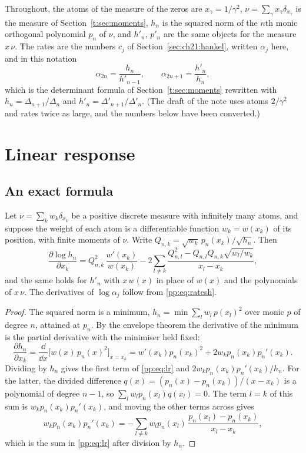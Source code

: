 Throughout, the atoms of the measure of the zeros are $x_\gamma=1/\gamma^2$, $\nu=\sum_\gamma x_\gamma\delta_{x_\gamma}$ is the measure of Section~\ref{t:sec:moments}, $h_n$ is the squared norm of the $n$th monic orthogonal polynomial $p_n$ of $\nu$, and $h'_n$, $p'_n$ are the same objects for the measure $x\,\nu$. The rates are the numbers $c_j$ of Section~\ref{sec:ch21:hankel}, written $\alpha_j$ here, and in this notation
\begin{equation}\label{pp:eq:ratesh}
\alpha_{2n}=\frac{h_n}{h'_{n-1}},\qquad \alpha_{2n+1}=\frac{h'_n}{h_n},
\end{equation}
which is the determinant formula of Section~\ref{t:sec:moments} rewritten with $h_n=\Delta_{n+1}/\Delta_n$ and $h'_n=\Delta'_{n+1}/\Delta'_n$. (The draft of the note uses atoms $2/\gamma^2$ and rates twice as large, and the numbers below have been converted.)

\section{Linear response}\label{pp:sec:lr}

\subsection{An exact formula}

\begin{theorem}\label{pp:thm:lr}
Let $\nu=\sum_kw_k\delta_{x_k}$ be a positive discrete measure with infinitely many atoms, and suppose the weight of each atom is a differentiable function $w_k=w(x_k)$ of its position, with finite moments of $\nu$. Write $Q_{n,k}=\sqrt{w_k}\,p_n(x_k)/\sqrt{h_n}$. Then
\begin{equation}\label{pp:eq:lr}
\frac{\partial\log h_n}{\partial x_k}=Q_{n,k}^2\,\frac{w'(x_k)}{w(x_k)}-2\sum_{l\ne k}\frac{Q_{n,l}^2-Q_{n,l}Q_{n,k}\sqrt{w_l/w_k}}{x_l-x_k},
\end{equation}
and the same holds for $h'_n$ with $x\,w(x)$ in place of $w(x)$ and the polynomials of $x\,\nu$. The derivatives of $\log\alpha_j$ follow from \eqref{pp:eq:ratesh}.
\end{theorem}

\begin{proof}
The squared norm is a minimum, $h_n=\min\sum_lw_l\,p(x_l)^2$ over monic $p$ of degree $n$, attained at $p_n$. By the envelope theorem the derivative of the minimum is the partial derivative with the minimiser held fixed:
\[
\frac{\partial h_n}{\partial x_k}=\frac{\dd}{\dd x}\Big[w(x)\,p_n(x)^2\Big]_{x=x_k}=w'(x_k)p_n(x_k)^2+2w_kp_n(x_k)p_n'(x_k).
\]
Dividing by $h_n$ gives the first term of \eqref{pp:eq:lr} and $2w_kp_n(x_k)p_n'(x_k)/h_n$. For the latter, the divided difference $q(x)=(p_n(x)-p_n(x_k))/(x-x_k)$ is a polynomial of degree $n-1$, so $\sum_lw_lp_n(x_l)q(x_l)=0$. The term $l=k$ of this sum is $w_kp_n(x_k)p_n'(x_k)$, and moving the other terms across gives
\[
w_kp_n(x_k)p_n'(x_k)=-\sum_{l\ne k}w_lp_n(x_l)\,\frac{p_n(x_l)-p_n(x_k)}{x_l-x_k},
\]
which is the sum in \eqref{pp:eq:lr} after division by $h_n$.
\end{proof}

